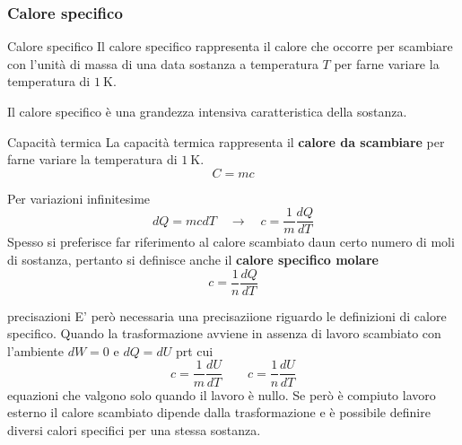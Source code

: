 \documentclass[x11names]{article}
\begin{document}
	\subsubsection{Calore specifico}
	\begin{center}
		\colorbox{yblue}{\begin{minipage}{5.75in}
				\begin{blues}{Calore specifico}
					Il calore specifico rappresenta il calore che occorre per scambiare con l'unità di massa di una data sostanza a temperatura \(T\) per farne variare la temperatura di \(\SI{1}{\kelvin}\).
					
					Il calore specifico è una grandezza intensiva caratteristica della sostanza.
				\end{blues}
		\end{minipage}}
	\end{center}
	\begin{center}
		\colorbox{yblue}{\begin{minipage}{5.75in}
				\begin{blues}{Capacità termica}
					La capacità termica rappresenta il \textbf{calore da scambiare}  per farne variare la temperatura di \(\SI{1}{\kelvin}\).
					\[ 
					C = mc
					\]
				\end{blues}
		\end{minipage}}
	\end{center}
	Per variazioni infinitesime
	\[ 
	dQ  =mc dT \quad \to \quad c = \frac{1}{m}\frac{dQ}{dT}
	\]
	Spesso si preferisce far riferimento al calore scambiato daun certo numero di moli di sostanza, pertanto si definisce   anche il \textbf{calore specifico molare}
	\[ 
	c = \frac{1}{n}\frac{dQ}{dT}
	\]
	\begin{es}{precisazioni}
	 E' però necessaria una precisaziione riguardo le definizioni di calore specifico. Quando la trasformazione avviene in assenza di lavoro scambiato con l'ambiente \(dW = 0\) e \(dQ = dU\) prt cui
	 \begin{equation}
	 	c  = \frac{1}{m}\frac{dU}{dT} \qquad c  = \frac{1}{n}\frac{dU}{dT}
	 \end{equation}
	 equazioni che valgono solo quando il lavoro è nullo. Se però è compiuto lavoro esterno il calore scambiato dipende dalla trasformazione e è possibile definire diversi calori specifici per una stessa sostanza.
	\end{es}
\end{document}
